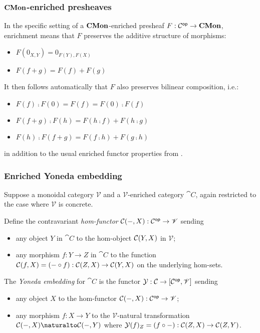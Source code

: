 \subsubsection{$\mathbf{CMon}$-enriched presheaves}

In the specific setting of a $\mathbf{CMon}$-enriched presheaf $F: \mathcal{C}^{\mathsf{op}} \to \mathbf{CMon}$, enrichment means that $F$
preserves the additive structure of morphisms:
\begin{itemize}
\item $F(0_{X,Y}) = 0_{F(Y),F(X)}$
\item $F(f + g) = F(f) + F(g)$
\end{itemize}
It then follows automatically that $F$ also preserves bilinear composition, i.e.:
\begin{itemize}
\item $F(f) \comp F(0) = F(f) = F(0) \comp F(f)$
\item $F(f + g) \comp F(h) = F(h \comp f) + F(h \comp g)$
\item $F(h) \comp F(f + g) = F(f \comp h) + F(g \comp h)$
\end{itemize}
in addition to the usual enriched functor properties from .

\subsubsection{Enriched Yoneda embedding}

Suppose a monoidal category $\mathscr{V}$ and a $\mathscr{V}$-enriched category $\cat{C}$, again restricted to
the case where $\mathscr{V}$ is concrete.

\begin{definition}
Define the contravariant \emph{hom-functor} ${\mathcal{C}}(-,X): \mathcal{C}^{\mathsf{op}} \to \mathscr{V}$ sending
\begin{itemize}
\item any object $Y$ in $\cat{C}$ to the hom-object ${\mathcal{C}}(Y,X)$ in $\mathscr{V}$;
\item any morphism $f: Y \to Z$ in $\cat{C}$ to the function ${\mathcal{C}}(f,X) = (- \circ f):
{\mathcal{C}}(Z,X) \to {\mathcal{C}}(Y,X)$ on the underlying hom-sets.
\end{itemize}
\end{definition}

\begin{definition}
The \emph{Yoneda embedding} for $\cat{C}$ is the functor $\mathcal{Y}: \mathcal{C} \to
[\mathcal{C}^{\mathsf{op}},\mathscr{V}]$ sending
\begin{itemize}
\item any object $X$ to the hom-functor ${\mathcal{C}}(-,X): \mathcal{C}^{\mathsf{op}} \to \mathscr{V}$;
\item any morphism $f: X \to Y$ to the $\mathscr{V}$-natural transformation $\Hom{\cat{C}}{-}{X} \naturalto
\Hom{\cat{C}}{-}{Y}$ where $\mathcal{Y}(f)_Z = (f \circ -): {\mathcal{C}}(Z,X) \to {\mathcal{C}}(Z,Y)$.
\end{itemize}
\end{definition}

